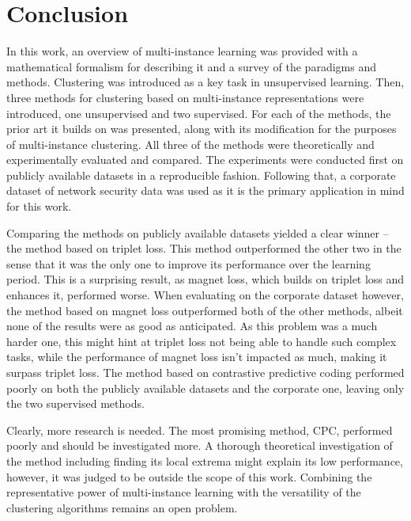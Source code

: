 \chapter*{Conclusion}

In this work, an overview of multi-instance learning was provided with a mathematical formalism for describing it and a survey of the paradigms and methods. Clustering was introduced as a key task in unsupervised learning. Then, three methods for clustering based on multi-instance representations were introduced, one unsupervised and two supervised. For each of the methods, the prior art it builds on was presented, along with its modification for the purposes of multi-instance clustering. All three of the methods were theoretically and experimentally evaluated and compared. The experiments were conducted first on publicly available datasets in a reproducible fashion. Following that, a corporate dataset of network security data was used as it is the primary application in mind for this work.

Comparing the methods on publicly available datasets yielded a clear winner -- the method based on triplet loss. This method outperformed the other two in the sense that it was the only one to improve its performance over the learning period. This is a surprising result, as magnet loss, which builds on triplet loss and enhances it, performed worse. When evaluating on the corporate dataset however, the method based on magnet loss outperformed both of the other methods, albeit none of the results were as good as anticipated. As this problem was a much harder one, this might hint at triplet loss not being able to handle such complex tasks, while the performance of magnet loss isn't impacted as much, making it surpass triplet loss. The method based on contrastive predictive coding performed poorly on both the publicly available datasets and the corporate one, leaving only the two supervised methods.

Clearly, more research is needed. The most promising method, CPC, performed poorly and should be investigated more. A thorough theoretical investigation of the method including finding its local extrema might explain its low performance, however, it was judged to be outside the scope of this work. Combining the representative power of multi-instance learning with the versatility of the clustering algorithms remains an open problem.
